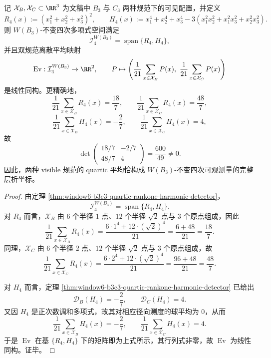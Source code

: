 \begin{theorem}\label{thm:conclusion-window6-double-gauge-quartic-tomography-completeness}
记 \(\mathcal X_B,\mathcal X_C\subset \RR^3\) 为文稿中 \(B_3\) 与 \(C_3\) 两种规范下的可见配置，并定义
\[
R_4(x):=(x_1^2+x_2^2+x_3^2)^2,
\qquad
H_4(x):=x_1^4+x_2^4+x_3^4-3(x_1^2x_2^2+x_1^2x_3^2+x_2^2x_3^2).
\]
则 \(W(B_3)\)-不变四次多项式空间满足
\[
\mathcal I_4^{W(B_3)}=\operatorname{span}\{R_4,H_4\},
\]
并且双规范离散平均映射
\[
\operatorname{Ev}:\mathcal I_4^{W(B_3)}\to\RR^2,
\qquad
P\mapsto
\left(
\frac1{21}\sum_{x\in\mathcal X_B}P(x),\
\frac1{21}\sum_{x\in\mathcal X_C}P(x)
\right)
\]
是线性同构。更精确地，
\[
\frac1{21}\sum_{x\in\mathcal X_B}R_4(x)=\frac{18}{7},
\qquad
\frac1{21}\sum_{x\in\mathcal X_C}R_4(x)=\frac{48}{7},
\]
\[
\frac1{21}\sum_{x\in\mathcal X_B}H_4(x)=-\frac{2}{7},
\qquad
\frac1{21}\sum_{x\in\mathcal X_C}H_4(x)=4,
\]
故
\[
\det
\begin{pmatrix}
18/7 & -2/7\\
48/7 & 4
\end{pmatrix}
=
\frac{600}{49}\neq 0.
\]
因此，两种 visible 规范的 quartic 平均恰构成 \(W(B_3)\)-不变四次可观测量的完整层析坐标。
\end{theorem}
\begin{proof}
由定理 \ref{thm:window6-b3c3-quartic-rankone-harmonic-detector}，
\[
\mathcal I_4^{W(B_3)}=\operatorname{span}\{R_4,H_4\}.
\]
对 \(R_4\) 而言，\(\mathcal X_B\) 由 \(6\) 个半径 \(1\) 点、\(12\) 个半径 \(\sqrt 2\) 点与 \(3\) 个原点组成，因此
\[
\frac1{21}\sum_{x\in\mathcal X_B}R_4(x)
=
\frac{6\cdot 1^4+12\cdot (\sqrt2)^4}{21}
=
\frac{6+48}{21}
=
\frac{18}{7}.
\]
同理，\(\mathcal X_C\) 由 \(6\) 个半径 \(2\) 点、\(12\) 个半径 \(\sqrt2\) 点与 \(3\) 个原点组成，故
\[
\frac1{21}\sum_{x\in\mathcal X_C}R_4(x)
=
\frac{6\cdot 2^4+12\cdot (\sqrt2)^4}{21}
=
\frac{96+48}{21}
=
\frac{48}{7}.
\]

对 \(H_4\) 而言，定理 \ref{thm:window6-b3c3-quartic-rankone-harmonic-detector} 已给出
\[
\mathcal D_B(H_4)=-\frac27,
\qquad
\mathcal D_C(H_4)=4.
\]
又因 \(H_4\) 是正次数调和多项式，故其对相应径向测度的球平均为 \(0\)，从而
\[
\frac1{21}\sum_{x\in\mathcal X_B}H_4(x)=-\frac27,
\qquad
\frac1{21}\sum_{x\in\mathcal X_C}H_4(x)=4.
\]
于是 \(\operatorname{Ev}\) 在基 \(\{R_4,H_4\}\) 下的矩阵即为上式所示，其行列式非零，故 \(\operatorname{Ev}\) 为线性同构。证毕。
\end{proof}

